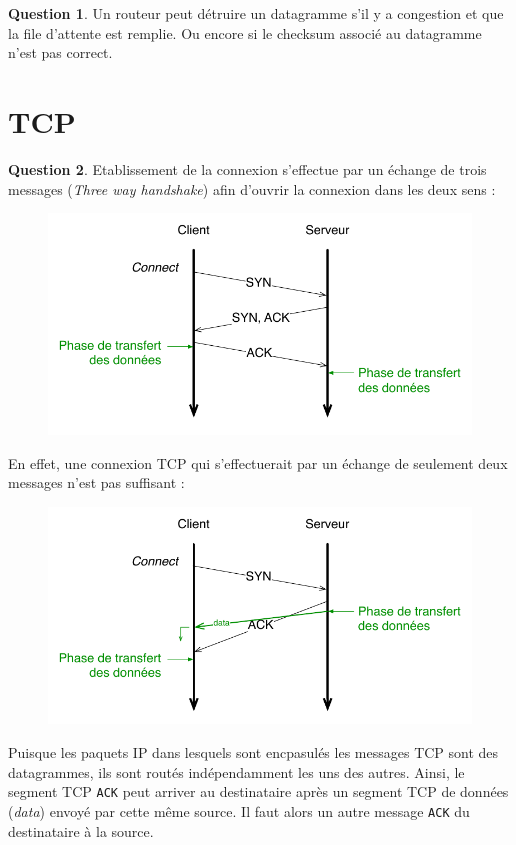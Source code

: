 \documentclass[11pt,english,french]{scrreprt}
\theoremstyle{remark}
\theoremstyle{definition}
\newtheorem{ques}{Question}[section]
\begin{document}
\begin{ques}
	Un routeur peut détruire un datagramme s'il y a congestion et que la file d'attente est remplie. Ou encore si le checksum associé au datagramme n'est pas correct.
\end{ques}

\section{TCP} %

\begin{ques}
	Etablissement de la connexion s'effectue par un échange de trois messages (\emph{Three way handshake}) afin d'ouvrir la connexion dans les deux sens :
	\begin{figure}[h]
		\center
		\includegraphics[scale=.7]{../graphes/TCP/Etablissement2}
	\end{figure}
	
	En effet, une connexion TCP qui s'effectuerait par un échange de seulement deux messages n'est pas suffisant :
	\begin{figure}[h]
		\center
		\includegraphics[scale=.7]{../graphes/TCP/Etablissement3}
	\end{figure}
	Puisque les paquets IP dans lesquels sont encpasulés les messages TCP sont des datagrammes, ils sont routés indépendamment les uns des autres. Ainsi, le segment TCP \lstinline!ACK! peut arriver au destinataire après un segment TCP de données (\emph{data}) envoyé par cette même source. Il faut alors un autre message \lstinline!ACK! du destinataire à la source.
\end{ques}
\end{document}
